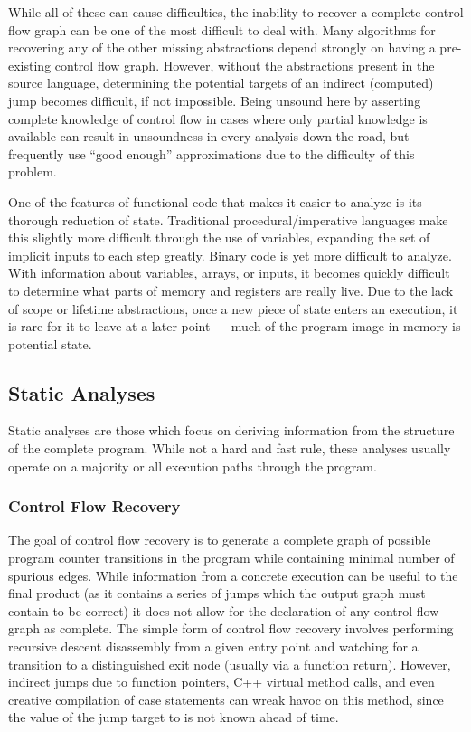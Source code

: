 While all of these can cause difficulties, the inability to recover a complete control flow graph can be one of the most difficult to deal with.
Many algorithms for recovering any of the other missing abstractions depend strongly on having a pre-existing control flow graph\cite{vsa,bddbddb,smash,tie,bitr,wrappedintervals,ramalingam2000}.
However, without the abstractions present in the source language, determining the potential targets of an indirect (computed) jump becomes difficult, if not impossible.
Being unsound here by asserting complete knowledge of control flow in cases where only partial knowledge is available can result in unsoundness in every analysis down the road, but frequently use ``good enough'' approximations due to the difficulty of this problem.

One of the features of functional code that makes it easier to analyze is its thorough reduction of state.
Traditional procedural/imperative languages make this slightly more difficult through the use of variables, expanding the set of implicit inputs to each step greatly.
Binary code is yet more difficult to analyze.
With information about variables, arrays, or inputs, it becomes quickly difficult to determine what parts of memory and registers are really live.
Due to the lack of scope or lifetime abstractions, once a new piece of state enters an execution, it is rare for it to leave at a later point --- much of the program image in memory is potential state.

\subsection{Static Analyses}
Static analyses are those which focus on deriving information from the structure of the complete program.
While not a hard and fast rule, these analyses usually operate on a majority or all execution paths through the program.

\subsubsection{Control Flow Recovery}
\label{sec:cfg}
The goal of control flow recovery is to generate a complete graph of possible program counter transitions in the program while containing minimal number of spurious edges.
While information from a concrete execution can be useful to the final product (as it contains a series of jumps which the output graph must contain to be correct) it does not allow for the declaration of any control flow graph as complete.
The simple form of control flow recovery involves performing recursive descent disassembly from a given entry point and watching for a transition to a distinguished exit node (usually via a function return).
However, indirect jumps due to function pointers, C++ virtual method calls, and even creative compilation of case statements can wreak havoc on this method, since the value of the jump target to is not known ahead of time.

